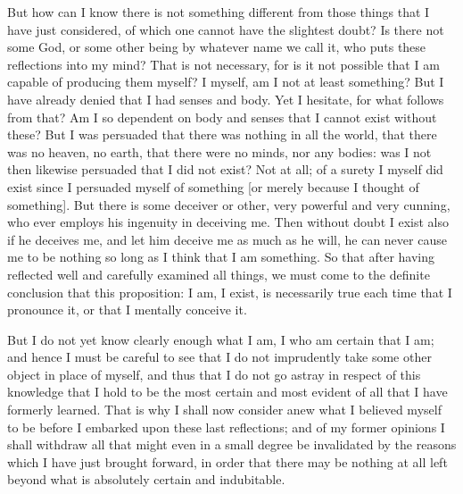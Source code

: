 But how can I know there is not something different from those
 things that I have just considered, of which one cannot
have the slightest doubt? Is there not some God, or some other being
by whatever name we call it, who puts these reflections into my mind?
That is not necessary, for is it not possible that I am capable of
producing them myself? I myself, am I not at least something? But I
have already denied that I had senses and body. Yet I hesitate, for
what follows from that? Am I so dependent on body and senses that I
cannot exist without these? But I was persuaded that there was nothing
in all the world, that there was no heaven, no earth, that there were
no minds, nor any bodies: was I not then likewise persuaded that I did
not exist? Not at all; of a surety I myself did exist since I
persuaded myself of something [or merely because I thought of
something]. But there is some deceiver or other, very powerful and
very cunning, who ever employs his ingenuity in deceiving me. Then
without doubt I exist also if he deceives me, and let him deceive me
as much as he will, he can never cause me to be nothing so long as I
think that I am something. So that after having reflected well and
carefully examined all things, we must come to the definite conclusion
that this proposition: I am, I exist, is necessarily true each time
that I pronounce it, or that I mentally conceive it.

But I do not yet know clearly enough what I am, I who am certain that
I am; and hence I must be careful to see that I do not imprudently
take some other object in place of myself, and thus that I do not go
astray in respect of this knowledge that I hold to be the most certain
and most evident of all that I have formerly learned. That is why I
shall now consider anew what I believed myself to be before I embarked
upon these last reflections; and of my former opinions I shall
withdraw all that might even in a small degree be invalidated by the
reasons which I have just brought forward, in order that there may be
nothing at all left beyond what is absolutely certain and indubitable.

